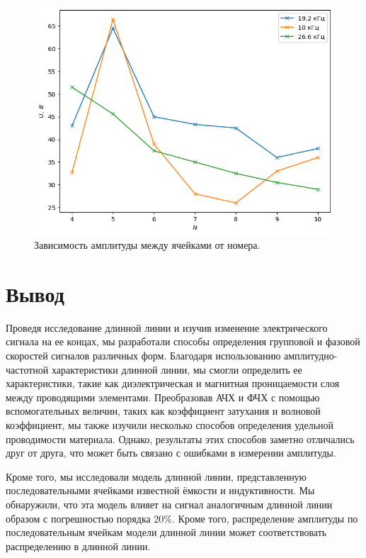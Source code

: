 \documentclass[a4paper,12pt]{article} %
\begin{document}
\begin{figure}[H]
    \centering
    \includegraphics[width=0.7\linewidth]{plot/fig7.png}
    \caption{Зависимость амплитуды между ячейками от номера.}
\end{figure}

\section{Вывод}
Проведя исследование длинной линии и изучив изменение электрического сигнала на ее концах, мы разработали способы определения групповой и фазовой скоростей сигналов различных форм. Благодаря использованию амплитудно-частотной характеристики длинной линии, мы смогли определить ее характеристики, такие как диэлектрическая и магнитная проницаемости слоя между проводящими элементами. Преобразовав АЧХ и ФЧХ с помощью вспомогательных величин, таких как коэффициент затухания и волновой коэффициент, мы также изучили несколько способов определения удельной проводимости материала. Однако, результаты этих способов заметно отличались друг от друга, что может быть связано с ошибками в измерении амплитуды.

Кроме того, мы исследовали модель длинной линии, представленную последовательными ячейками известной ёмкости и индуктивности. Мы обнаружили, что эта модель влияет на сигнал аналогичным длинной линии образом с погрешностью порядка 20\%. Кроме того, распределение амплитуды по последовательным ячейкам модели длинной линии может соответствовать распределению в длинной линии.
\end{document}
